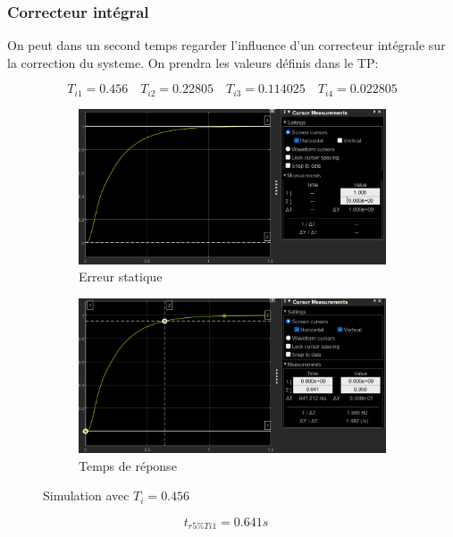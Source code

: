 \documentclass[12pt, a4paper]{report}
\begin{document}
\subsubsection{Correcteur intégral}
On peut dans un second temps regarder l'influence d'un correcteur intégrale sur la correction du systeme. On prendra les valeurs définis dans le TP:

\[
    T_{i1} = 0.456 \quad T_{i2} = 0.22805 \quad T_{i3} = 0.114025 \quad T_{i4} = 0.022805
\]

\begin{figure}[H]
    \begin{subfigure}[h!]{0.4\linewidth}
        \includegraphics[width=\linewidth]{sim2ti1erreur.png}
        \caption{Erreur statique}
    \end{subfigure}
    \hfill    
    \begin{subfigure}[h!]{0.4\linewidth}
        \includegraphics[width=\linewidth]{sim2ti1tr.png}
        \caption{Temps de réponse}
    \end{subfigure}
    \caption{Simulation avec $T_i = 0.456$}
    \label{fig:sim2KTi1}
\end{figure}

\[
    t_{r5\%Ti1} = 0.641s \quad
\]
\end{document}
